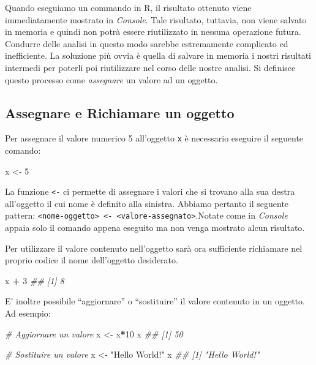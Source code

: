 \documentclass[
]{book}
\newenvironment{Shaded}{\begin{snugshade}}{\end{snugshade}}
\newcommand{\CommentTok}[1]{\textcolor[rgb]{0.56,0.35,0.01}{\textit{#1}}}
\newcommand{\DecValTok}[1]{\textcolor[rgb]{0.00,0.00,0.81}{#1}}
\newcommand{\NormalTok}[1]{#1}
\newcommand{\OperatorTok}[1]{\textcolor[rgb]{0.81,0.36,0.00}{\textbf{#1}}}
\newcommand{\StringTok}[1]{\textcolor[rgb]{0.31,0.60,0.02}{#1}}
\begin{document}
Quando eseguiamo un commando in R, il risultato ottenuto viene immediatamente mostrato in \emph{Console}. Tale risultato, tuttavia, non viene salvato in memoria e quindi non potrà essere riutilizzato in nessuna operazione futura. Condurre delle analisi in questo modo sarebbe estremamente complicato ed inefficiente. La soluzione più ovvia è quella di salvare in memoria i nostri risultati intermedi per poterli poi riutilizzare nel corso delle nostre analisi. Si definisce questo processo come \emph{assegnare} un valore ad un oggetto.

\hypertarget{assegnare-e-richiamare-un-oggetto}{%
\subsection{Assegnare e Richiamare un oggetto}\label{assegnare-e-richiamare-un-oggetto}}

Per assegnare il valore numerico 5 all'oggetto \texttt{x} è necessario eseguire il seguente comando:

\begin{Shaded}
\begin{Highlighting}[]
\NormalTok{x <-}\StringTok{ }\DecValTok{5}
\end{Highlighting}
\end{Shaded}

La funzione \texttt{\textless{}-} ci permette di assegnare i valori che si trovano alla sua destra all'oggetto il cui nome è definito alla sinistra. Abbiamo pertanto il seguente pattern: \texttt{\textless{}nome-oggetto\textgreater{}\ \textless{}-\ \textless{}valore-assegnato\textgreater{}}.Notate come in \emph{Console} appaia solo il comando appena eseguito ma non venga mostrato alcun risultato.

Per utilizzare il valore contenuto nell'oggetto sarà ora sufficiente richiamare nel proprio codice il nome dell'oggetto desiderato.

\begin{Shaded}
\begin{Highlighting}[]
\NormalTok{x }\OperatorTok{+}\StringTok{ }\DecValTok{3}
\CommentTok{## [1] 8}
\end{Highlighting}
\end{Shaded}

E' inoltre possibile ``aggiornare'' o ``sostituire'' il valore contenuto in un oggetto. Ad esempio:

\begin{Shaded}
\begin{Highlighting}[]
\CommentTok{# Aggiornare un valore}
\NormalTok{x <-}\StringTok{ }\NormalTok{x}\OperatorTok{*}\DecValTok{10}
\NormalTok{x}
\CommentTok{## [1] 50}

\CommentTok{# Sostituire un valore}
\NormalTok{x <-}\StringTok{ "Hello World!"}
\NormalTok{x}
\CommentTok{## [1] "Hello World!"}
\end{Highlighting}
\end{Shaded}
\end{document}

